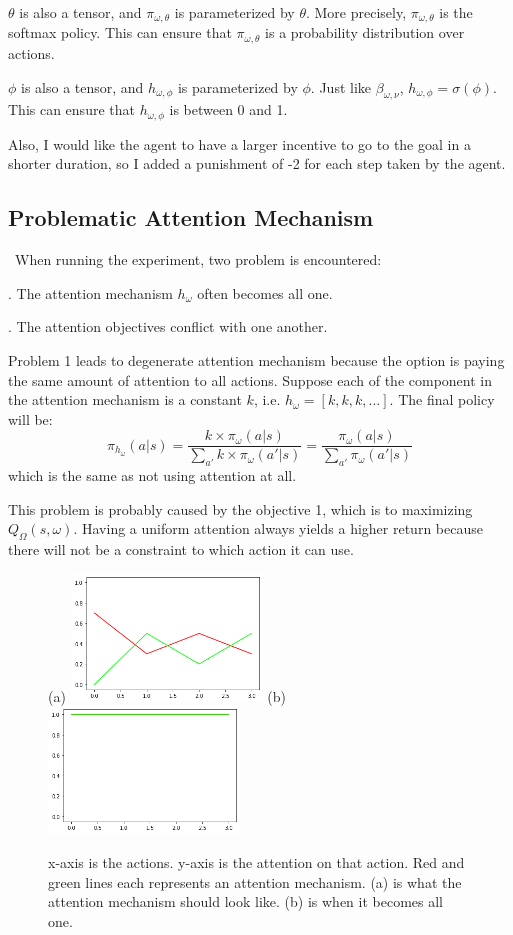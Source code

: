 \documentclass{article}
\begin{document}
	\quad $\theta$ is also a tensor, and $\pi_{\omega, \theta}$ is parameterized by $\theta$. More precisely, $\pi_{\omega, \theta}$ is the softmax policy. This can ensure that $\pi_{\omega, \theta}$ is a probability distribution over actions.
	
	\quad $\phi$ is also a tensor, and $h_{\omega, \phi}$ is parameterized by $\phi$. Just like $\beta_{\omega, \nu}$, $h_{\omega, \phi} = \sigma(\phi)$. This can ensure that $h_{\omega, \phi}$ is between 0 and 1.

	\quad Also, I would like the agent to have a larger incentive to go to the goal in a shorter duration, so I added a punishment of -2 for each step taken by the agent.
	\subsection*{Problematic Attention Mechanism}
	\qquad \ When running the experiment, two problem is encountered:
	
	. The attention mechanism $h_\omega$ often becomes all one. 
	
	. The attention objectives conflict with one another.
	
	\quad Problem 1 leads to degenerate attention mechanism because the option is paying the same amount of attention to all actions. Suppose each of the component in the attention mechanism is a constant $k$, i.e. $h_\omega = [k, k, k, ...]$. The final policy will be:
	$$\pi_{h_\omega}(a|s) = \frac{k \times \pi_\omega(a|s)}{\sum_{a'} k \times \pi_\omega(a'|s)} = \frac{\pi_\omega(a|s)}{\sum_{a'}\pi_\omega(a'|s)}$$
	which is the same as not using attention at all.
	
	\quad This problem is probably caused by the objective 1, which is to maximizing $Q_\Omega(s,\omega)$. Having a uniform attention always yields a higher return because there will not be a constraint to which action it can use.
	\begin{figure}[h]
		\centering
		\small{(a)}
		\includegraphics[width=2in]{attentionViz.png}
		\hspace{0.2in}
		\small{(b)}
		\includegraphics[width=2in]{all1s.png}
		\hspace{0.2in}
		\caption{x-axis is the actions. y-axis is the attention on that action. Red and green lines each represents an attention mechanism. (a) is what the attention mechanism should look like. (b) is when it becomes all one.}
	\end{figure}
\end{document}
